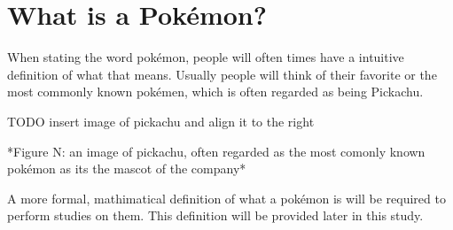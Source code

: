 \section{What is a Pokémon?}

When stating the word pokémon, people will often times have a intuitive definition of what that means. Usually people will think of their favorite or the most commonly known pokémen, which is often regarded as being Pickachu.

TODO insert image of pickachu and align it to the right

*Figure N: an image of pickachu, often regarded as the most comonly known pokémon as its the mascot of the company*

A more formal, mathimatical definition of what a pokémon is will be required to perform studies on them. This definition will be provided later in this study.